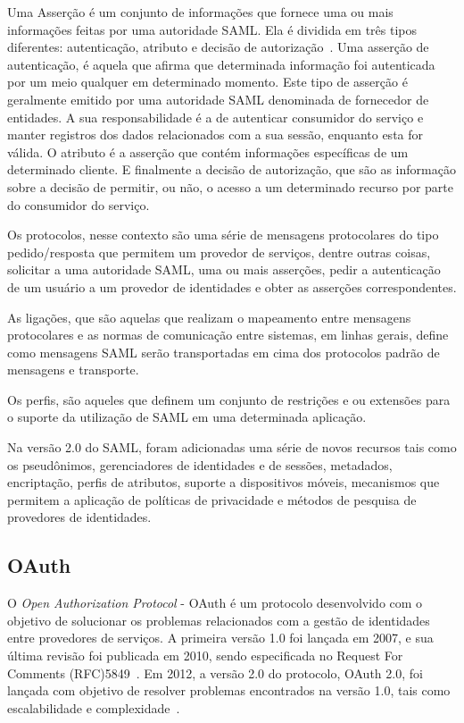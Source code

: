 Uma Asserção é um conjunto de informações que fornece uma ou mais informações feitas por uma autoridade SAML. Ela é dividida em três tipos diferentes: autenticação, atributo e decisão de autorização~\cite{Madsen2005,Nordbotten09,Bertino2010}. Uma asserção de autenticação, é aquela que afirma que determinada informação foi autenticada por um meio qualquer em determinado momento. Este tipo de asserção é geralmente emitido por uma autoridade SAML denominada de fornecedor de entidades. A sua responsabilidade é a de autenticar consumidor do serviço e manter registros dos dados relacionados com a sua sessão, enquanto esta for válida. O atributo é a asserção que contém informações específicas de um determinado cliente. E finalmente a decisão de autorização, que são as informação sobre a decisão de permitir, ou não, o acesso a um determinado recurso por parte do consumidor do serviço.

Os protocolos, nesse contexto são uma série de mensagens protocolares do tipo pedido/resposta que permitem um provedor de serviços, dentre outras coisas, solicitar a uma autoridade SAML, uma ou mais asserções, pedir a autenticação de um usuário a um provedor de identidades e obter as asserções correspondentes.

As ligações, que são aquelas que realizam o mapeamento entre mensagens protocolares e as normas de comunicação entre sistemas, em linhas gerais, define como mensagens SAML serão transportadas em cima dos protocolos padrão de mensagens e transporte.

Os perfis, são aqueles que definem um conjunto de restrições e ou extensões para o suporte da utilização de SAML em uma determinada aplicação.

Na versão 2.0 do SAML, foram adicionadas uma série de novos recursos tais como os pseudônimos, gerenciadores de identidades e de sessões, metadados, encriptação, perfis de atributos, suporte a dispositivos móveis, mecanismos que permitem a aplicação de políticas de privacidade e métodos de pesquisa de provedores de identidades.

\subsection{OAuth}

O \emph{Open Authorization Protocol} - OAuth é um protocolo desenvolvido com o objetivo de solucionar os problemas relacionados com a gestão de identidades entre provedores de serviços. A primeira versão 1.0 foi lançada em 2007, e sua última revisão foi publicada em 2010, sendo especificada no Request For Comments (RFC)5849~\cite{oauth210}. Em 2012, a versão 2.0 do protocolo, OAuth 2.0, foi lançada com objetivo de resolver problemas encontrados na versão 1.0, tais como escalabilidade e complexidade~\cite{rfc6749}.

